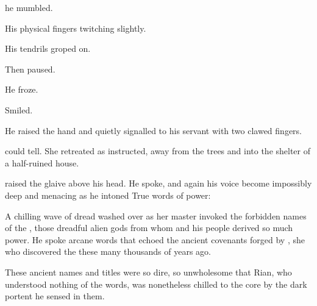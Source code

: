  he mumbled.  

His physical fingers twitching slightly. 

His tendrils groped on. 

Then paused. 

He froze. 

Smiled. 


% 

He raised the hand and quietly signalled to his servant with two clawed fingers. 

 \Criseis{} could tell. She retreated as instructed, away from the trees and into the shelter of a half-ruined house. 

\Ishnaruchaefir{} raised the glaive above his head. 
He spoke, and again his voice become impossibly deep and menacing as he intoned {True \Draconic} words of power:


A chilling wave of dread washed over \Criseis{} as her master invoked the forbidden names of the \xzaishanns, 
those dreadful alien gods from whom \Ishnaruchaefir{} and his people derived so much power. 
He spoke arcane words that echoed the ancient covenants forged by \Tiamat, she who discovered the \xzaishanns{} these many thousands of years ago. 







\begin{comment}
\subsubsection{Rian}
\end{comment}
\new
These ancient names and titles were so dire, so unwholesome that Rian, who understood nothing of the words, was nonetheless chilled to the core by the dark portent he sensed in them. 

